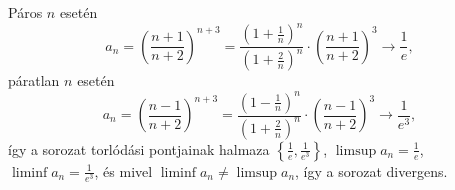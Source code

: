 \documentclass[11pt]{scrartcl}
\begin{document}
Páros $n$ esetén
\[
	a_n
	= \left( \frac{n + 1}{n + 2} \right)^{n + 3}
	= \frac{\left(1 + \frac{1}{n}\right)^n}{\left(1 + \frac{2}{n}\right)^n}
	\cdot \left( \frac{n + 1}{n + 2} \right)^3
	\to \frac{1}{e},
\]
páratlan $n$ esetén
\[
	a_n
	= \left( \frac{n - 1}{n + 2} \right)^{n + 3}
	= \frac{\left(1 - \frac{1}{n}\right)^n}{\left(1 + \frac{2}{n}\right)^n}
	\cdot \left( \frac{n - 1}{n + 2} \right)^3
	\to \frac{1}{e^3},
\]
így a sorozat torlódási pontjainak halmaza
$\left\{ \frac{1}{e}, \frac{1}{e^3} \right\}$,
$\limsup a_n = \frac{1}{e}$,
$\liminf a_n = \frac{1}{e^3}$, és mivel
$\liminf a_n \ne \limsup a_n$, így a sorozat divergens.
\end{document}
